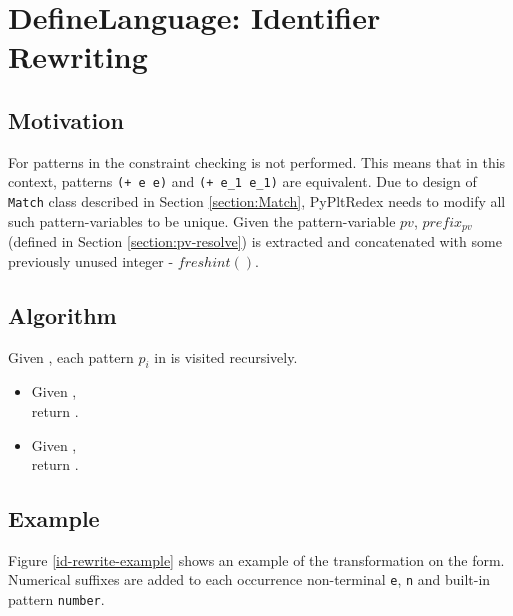 \section{DefineLanguage: Identifier Rewriting}
\label{section:id-rewrite}

\subsection{Motivation}

For patterns in the \DefineLanguageNoArg \space constraint checking is not performed. This means that in this context, patterns \texttt{(+ e e)} and \texttt{(+ e\_1 e\_1)} are equivalent. Due to design of \texttt{Match} class described in Section \ref{section:Match}, PyPltRedex needs to modify all such pattern-variables to be unique. Given the pattern-variable $pv$, $\mathit{prefix_{pv}}$ (defined in Section \ref{section:pv-resolve}) is extracted and concatenated with some previously unused integer - $\mathit{freshint()}$.

\subsection{Algorithm}
Given , each pattern $p_i$ in \NtDefinitionN \space is visited recursively.
\begin{itemize}
\item Given \BuiltInPattern, \\ return .
\item Given \NonTerminal, \\ return .
\end{itemize}

\subsection{Example}

Figure \ref{id-rewrite-example} shows an example of the transformation on the \DefineLanguage form. Numerical suffixes are added to each occurrence non-terminal \texttt{e}, \texttt{n} and built-in pattern \texttt{number}.

